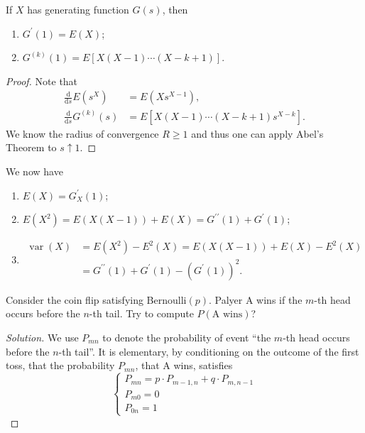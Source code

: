 \documentclass[11pt,singlecolumn, openany, citestyle=authoryear]{elegantbook}
\begin{document}
\begin{CJK}{UTF8}{gbsn}
\begin{lemma}
    If $X$ has generating function $G(s)$, then 
    \begin{enumerate}
        \item $G^\prime(1)=E(X)$;
        \item $G^{(k)}(1)=E[X(X-1)\cdots(X-k+1)]$.
    \end{enumerate}
\end{lemma}
\begin{proof}
    Note that
\begin{align*}
    \frac{\mathrm{d}}{\mathrm{d}s} E(s^X) &= E(Xs^{X-1}),\\
    \frac{\mathrm{d}}{\mathrm{d}s} G^{(k)}(s)&=E[X(X-1)\cdots(X-k+1)s^{X-k}].
\end{align*}
We know the radius of convergence $R\geqslant 1$ and thus one can apply Abel's Theorem to $s\uparrow 1$. 
\end{proof}
\begin{example}
    We now have 
    \begin{enumerate}
        \item $E(X)=G_X^\prime(1)$;
        \item $E(X^2) = E(X(X-1)) +E(X) = G^{\prime\prime}(1)+G^\prime(1)$;
        \item 
        \begin{align*}
            \operatorname{var}(X)&=E(X^2)-E^2(X)=
            E(X(X-1))+E(X)-E^2(X)\\
             &= G^{\prime\prime}(1)+G^\prime(1)-
        (G^\prime(1))^2.
        \end{align*}
    \end{enumerate}
\end{example}
\begin{example}
    Consider the coin flip satisfying Bernoulli$(p)$. Palyer A wins if the $m$-th 
    head occurs before the $n$-th tail. Try to compute $P(\text{A wins})$?
\end{example}
\begin{proof}[Solution]
    We use $P_{mn}$ to denote the probability of event ``the $m$-th 
    head occurs before the $n$-th tail''. It is elementary, by conditioning on the
    outcome of the first toss, that the probability $P_{mn}$, that A wins, satisfies 
    $$
    \begin{cases}
        P_{mn}=p\cdot P_{m-1,n}+q\cdot P_{m,n-1}\\
        P_{m0}=0\\
        P_{0n}=1
    \end{cases}
$$
\end{proof}
\end{CJK}
\end{document}

